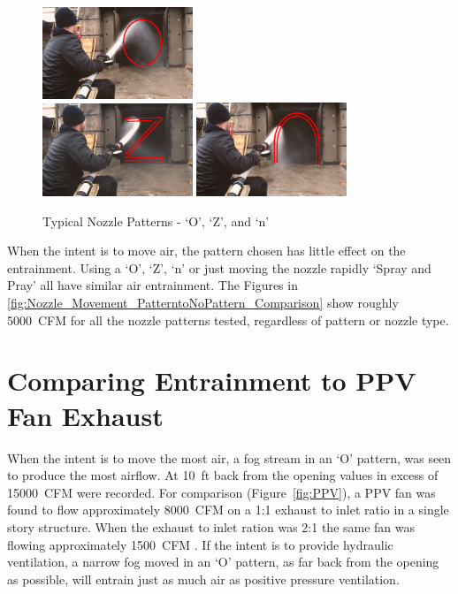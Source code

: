 \documentclass[12pt,oneside]{book}
\begin{document}
\begin{figure}[H]
\centering
\includegraphics[width=0.4\textwidth]{Figures/Air_Entrainment/O_Patern_Visual.png} \\
\includegraphics[width=0.4\textwidth]{Figures/Air_Entrainment/Z_Patern_Visual.png}
\includegraphics[width=0.4\textwidth]{Figures/Air_Entrainment/N_Patern_Visual.png}
\caption{Typical Nozzle Patterns - `O', `Z', and `n'}
\label{fig:O_Z_N_Pattern}
\end{figure}

When the intent is to move air, the pattern chosen has little effect on the entrainment. Using a `O', `Z', `n' or just moving the nozzle rapidly `Spray and Pray' all have similar air entrainment. The Figures in \ref{fig:Nozzle_Movement_PatterntoNoPattern_Comparison} show roughly 5000~CFM for all the nozzle patterns tested, regardless of pattern or nozzle type. 

\section{Comparing Entrainment to PPV Fan Exhaust}
When the intent is to move the most air, a fog stream in an `O' pattern, was seen to produce the most airflow. At 10~ft back from the opening values in excess of 15000~CFM were recorded. For comparison (Figure~\ref{fig:PPV}), a PPV fan was found to flow approximately 8000~CFM on a 1:1 exhaust to inlet ratio in a single story structure. When the exhaust to inlet ration was 2:1 the same fan was flowing approximately 1500~CFM \cite{Zevotek_Kerber:2016}. If the intent is to provide hydraulic ventilation, a narrow fog moved in an `O' pattern, as far back from the opening as possible, will entrain just as much air as positive pressure ventilation. 
\end{document}
